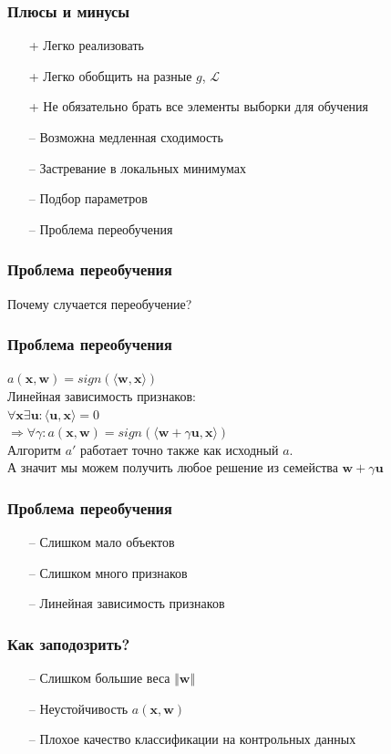 \documentclass[12pt]{beamer}
\begin{document}
\begin{frame}\frametitle{Плюсы и минусы}
\begin{itemize}
\item[+] Легко реализовать
\item[+] Легко обобщить на разные $g$, $\mathcal{L}$
\item[+] Не обязательно брать все элементы выборки для обучения
\end{itemize}
\begin{itemize}
\item[--] Возможна медленная сходимость
\item[--] Застревание в локальных минимумах
\item[--] Подбор параметров
\item[--] Проблема переобучения
\end{itemize}
\end{frame}

\begin{frame}\frametitle{Проблема переобучения}
Почему случается переобучение?
\end{frame}

\begin{frame}\frametitle{Проблема переобучения}
$a(\mathbf{x}, \mathbf{w}) = sign(\langle \mathbf{w}, \mathbf{x}\rangle)$\\
Линейная зависимость признаков:\\
$\forall \mathbf{x} \exists \mathbf{u}: \langle \mathbf{u}, \mathbf{x}\rangle = 0$\\
$\Rightarrow \forall \gamma: a(\mathbf{x}, \mathbf{w}) = sign(\langle \mathbf{w} + \gamma \mathbf{u}, \mathbf{x}\rangle)$\\
\vspace{5mm}
Алгоритм $a'$ работает точно также как исходный $a$.\\
А значит мы можем получить любое решение из семейства $\mathbf{w} + \gamma \mathbf{u}$
\end{frame}

\begin{frame}\frametitle{Проблема переобучения}
\begin{itemize}
\item[--] Слишком мало объектов
\item[--] Слишком много признаков
\item[--] Линейная зависимость признаков
\end{itemize}
\end{frame}

\begin{frame}\frametitle{Как заподозрить?}
\begin{itemize}
\item[--] Слишком большие веса $\Vert \mathbf{w} \Vert$
\item[--] Неустойчивость $a(\mathbf{x},\mathbf{w})$
\item[--] Плохое качество классификации на контрольных данных
\end{itemize}
\end{frame}
\end{document}
